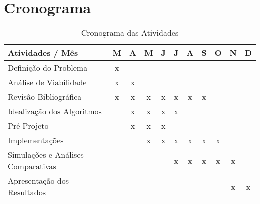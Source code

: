 	\chapter{Cronograma}
	\label{chap:Cronograma}

	\begin{table}[h!]
	\centering
	\small
		\begin{tabular}{| l | c | c|c | c | c |  c | c | c |  c | c |}
			\hline
			Atividades / Mês &  M & A & M & J & J & A & S & O & N & D \\
			\hline
			Definição do Problema &  x &  &  &  &  &  &  &  &  &  \\
			\hline
			Análise de Viabilidade &  x & x  &  &  &  &  &  &  &  &  \\
			\hline
			Revisão Bibliográfica &  x & x  & x &x  & x & x & x &  &  &  \\
			\hline
			Idealização dos Algoritmos &   & x & x & x & x &  &  &  &  &  \\
			\hline
			Pré-Projeto  &   & x & x & x &  &  &  &  &  &  \\
			\hline
			Implementações &   &  & x & x & x & x & x & x &  &  \\
			\hline
			Simulações e Análises Comparativas &   &  &  &  & x & x & x & x & x &  \\
			\hline
			Apresentação dos Resultados &   &  &  &  &  &  &  &  & x & x \\
			\hline
		\end{tabular}
	
		\caption{Cronograma das Atividades}
		\label{tbl:cronograma}
	\end{table}
